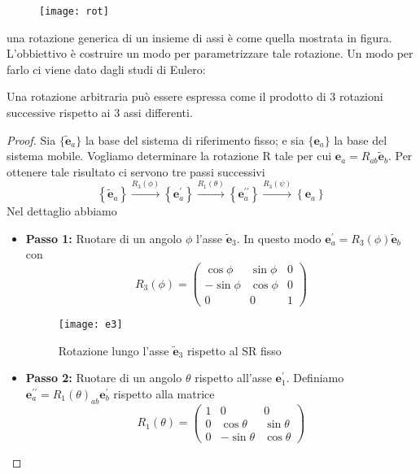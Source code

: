  
\begin{figure}[!ht]
\vspace{0.1in}
\texttt{[image: rot]}	
\centering
\vspace{0.1in}
\end{figure}

una rotazione generica di un insieme di assi \`{e} come quella mostrata in figura. L'obbiettivo \`{e} costruire un modo per parametrizzare tale rotazione. Un modo per farlo ci viene dato dagli studi di Eulero:

\begin{theorem}
	Una rotazione arbitraria pu\`{o} essere espressa come il prodotto di 3 rotazioni successive rispetto ai 3 assi differenti.
\end{theorem}
\begin{proof}
	Sia $\{\tilde{\bm{e}}_{a}\}$ la base del sistema di riferimento fisso; e sia $\{\bm{e}_{a}\}$ la base del sistema mobile. Vogliamo determinare la rotazione R tale per cui $\bm{e}_{a} = R_{ab}\tilde{\bm{e}}_{b}$. Per ottenere tale risultato ci servono tre passi successivi
	\begin{equation*}
\left\{\tilde{\mathbf{e}}_a\right\} \xrightarrow{R_3(\phi)}\left\{\mathbf{e}_a^{\prime}\right\} \xrightarrow{R_1(\theta)}\left\{\mathbf{e}_a^{\prime \prime}\right\} \xrightarrow{R_3(\psi)}\left\{\mathbf{e}_a\right\}
\end{equation*}
Nel dettaglio abbiamo
\begin{itemize}
	\item \textbf{Passo 1:} Ruotare di un angolo $\phi$ l'asse $\bm{\tilde{e}}_3$. In questo modo $\bm{e}_{a}^{\prime} = R_3(\phi)\tilde{\bm{e}}_{b}$ con 
	\begin{equation*}
R_3(\phi)=\left(\begin{array}{ccc}
\cos \phi & \sin \phi & 0 \\
-\sin \phi & \cos \phi & 0 \\
0 & 0 & 1
\end{array}\right)
\end{equation*}
 
\begin{figure}[!ht]
\vspace{0.1in}
\texttt{[image: e3]}	
\centering
\vspace{0.1in}
\caption{Rotazione lungo l'asse $\bm{\tilde{e}}_3$ rispetto al SR fisso }
\end{figure}

\item \textbf{Passo 2:} Ruotare di un angolo $\theta$ rispetto all'asse $\bm{e}_{1}^{\prime}$. Definiamo $\bm{e}_{a}^{\prime \prime} = R_1(\theta)_{ab}\bm{e}^{\prime}_{b}$ rispetto alla matrice 
\begin{equation*}
R_1(\theta)=\left(\begin{array}{ccc}
1 & 0 & 0 \\
0 & \cos \theta & \sin \theta \\
0 & -\sin \theta & \cos \theta
\end{array}\right)
\end{equation*}


\end{itemize}
\end{proof}
